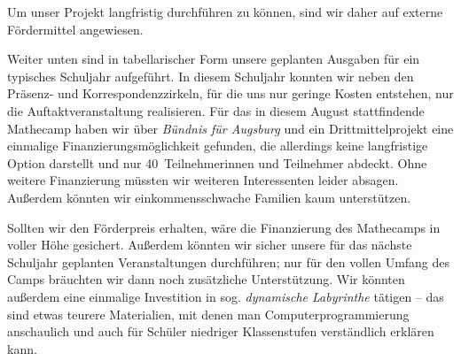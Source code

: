 \documentclass[12pt]{zettel}
\begin{document}
Um unser Projekt langfristig durchführen zu können, sind wir daher auf externe
Fördermittel angewiesen.

Weiter unten sind in tabellarischer Form unsere geplanten Ausgaben für ein
typisches Schuljahr aufgeführt. In diesem Schuljahr konnten wir
neben den Präsenz- und Korrespondenzzirkeln, für die uns nur geringe Kosten
entstehen, nur die Auftaktveranstaltung realisieren. Für das in diesem August
stattfindende Mathecamp haben wir über \emph{Bündnis für Augsburg} und ein
Drittmittelprojekt eine einmalige Finanzierungsmöglichkeit gefunden, die
allerdings keine langfristige Option darstellt und nur 40~Teilnehmerinnen und
Teilnehmer abdeckt. Ohne weitere Finanzierung müssten wir weiteren
Interessenten leider absagen. Außerdem könnten wir einkommensschwache Familien
kaum unterstützen.

Sollten wir den Förderpreis erhalten, wäre die Finanzierung des Mathecamps in
voller Höhe gesichert. Außerdem könnten wir sicher unsere für das nächste Schuljahr
geplanten Veranstaltungen durchführen; nur für den vollen Umfang des
Camps bräuchten wir dann noch zusätzliche Unterstützung. Wir könnten außerdem
eine einmalige Investition in sog. \emph{dynamische Labyrinthe} tätigen --
das sind etwas teurere Materialien, mit denen man
Computerprogrammierung anschaulich und auch für Schüler niedriger Klassenstufen
verständlich erklären kann.
\end{document}
